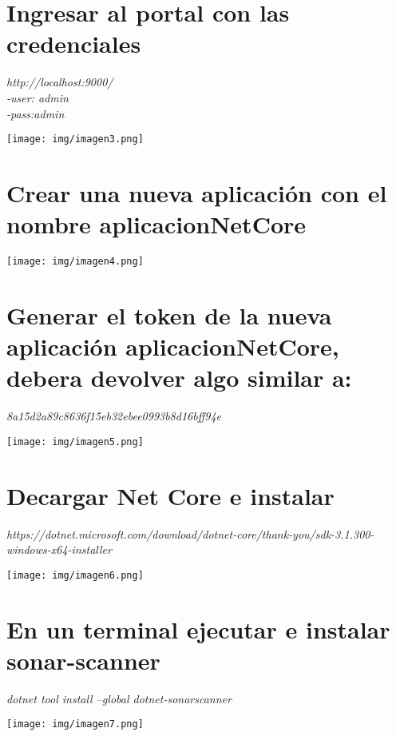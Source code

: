 \documentclass[12pt,letterpaper]{article}
\begin{document}
\newpage
\section{Ingresar al portal con las credenciales} 
\textit{http://localhost:9000/
\\-user: admin
\\-pass:admin}
        \begin{center}
            \texttt{[image: img/imagen3.png]}  
        \end{center}

       

\section{Crear una nueva aplicación con el nombre aplicacionNetCore}
        \begin{center}
            \texttt{[image: img/imagen4.png]}  
        \end{center}
\section{Generar el token de la nueva aplicación aplicacionNetCore, debera devolver algo similar a:}
    \textit{8a15d2a89c8636f15eb32ebee0993b8d16bff94e}
        \begin{center}
            \texttt{[image: img/imagen5.png]}  
        \end{center}
\newpage
\section{Decargar Net Core e instalar}
\textit{https://dotnet.microsoft.com/download/dotnet-core/thank-you/sdk-3.1.300-windows-x64-installer}
        \begin{center}
            \texttt{[image: img/imagen6.png]}  
        \end{center}

\section{En un terminal ejecutar e instalar sonar-scanner} 

\textit{dotnet tool install --global dotnet-sonarscanner}
        \begin{center}
            \texttt{[image: img/imagen7.png]}  
        \end{center}
\end{document}
